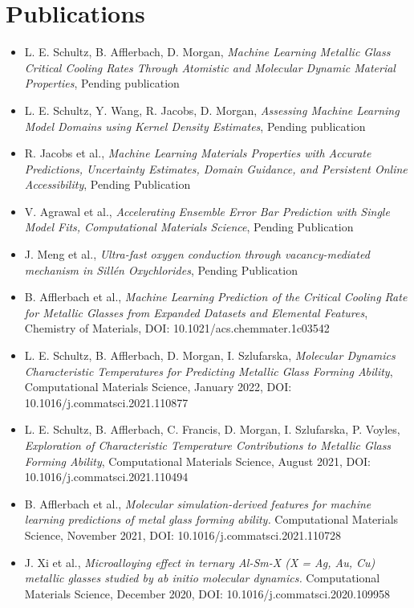 \section{Publications}

\begin{itemize}
    \item L. E. Schultz, B. Afflerbach,  D. Morgan, \textit{Machine Learning Metallic Glass Critical Cooling Rates Through Atomistic and Molecular Dynamic Material Properties}, Pending publication
    \item L. E. Schultz, Y. Wang, R. Jacobs,  D. Morgan, \textit{Assessing Machine Learning Model Domains using Kernel Density Estimates}, Pending publication
    \item R. Jacobs et al., \textit{Machine Learning Materials Properties with Accurate Predictions, Uncertainty Estimates, Domain Guidance, and Persistent Online Accessibility}, Pending Publication
    \item V. Agrawal et al., \textit{Accelerating Ensemble Error Bar Prediction with Single Model Fits, Computational Materials Science}, Pending Publication
    \item J. Meng et al., \textit{Ultra-fast oxygen conduction through vacancy-mediated mechanism in Sillén Oxychlorides}, Pending Publication
    \item B. Afflerbach et al., \textit{Machine Learning Prediction of the Critical Cooling Rate for Metallic Glasses from Expanded Datasets and Elemental Features}, Chemistry of Materials, DOI: 10.1021/acs.chemmater.1c03542
    \item L. E. Schultz, B. Afflerbach, D. Morgan, I. Szlufarska, \textit{Molecular Dynamics Characteristic Temperatures for Predicting Metallic Glass Forming Ability}, Computational Materials Science, January 2022, DOI: 10.1016/j.commatsci.2021.110877
    \item L. E. Schultz, B. Afflerbach, C. Francis, D. Morgan, I. Szlufarska, P. Voyles, \textit{Exploration of Characteristic Temperature Contributions to Metallic Glass Forming Ability}, Computational Materials Science, August 2021, DOI: 10.1016/j.commatsci.2021.110494
   \item B. Afflerbach et al., \textit{Molecular simulation-derived features for machine learning predictions of metal glass forming ability.} Computational Materials Science, November 2021, DOI: 10.1016/j.commatsci.2021.110728
    \item J. Xi et al., \textit{Microalloying effect in ternary Al-Sm-X (X = Ag, Au, Cu) metallic glasses studied by ab initio molecular dynamics.} Computational Materials Science, December 2020, DOI: 10.1016/j.commatsci.2020.109958

\end{itemize}
